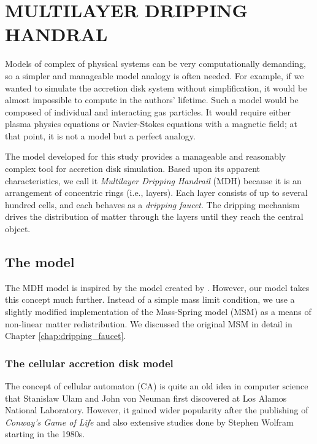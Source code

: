 \chapter{MULTILAYER DRIPPING HANDRAL}
    \label{chap:multilayer_dripping_handrail}
    \thispagestyle{empty}

    Models of complex of physical systems can be very computationally demanding, so a simpler and manageable model analogy is often needed. For example, if we wanted to simulate the accretion disk system without simplification, it would be almost impossible to compute in the authors' lifetime. Such a model would be composed of individual and interacting gas particles. It would require either plasma physics equations or Navier-Stokes equations with a magnetic field; at that point, it is not a model but a perfect analogy. 

    The model developed for this study provides a manageable and reasonably complex tool for accretion disk simulation. Based upon its apparent characteristics, we call it \emph{Multilayer Dripping Handrail} (MDH) because it is an arrangement of concentric rings (i.e., layers). Each layer consists of up to several hundred cells, and each behaves as a \emph{dripping faucet}. The dripping mechanism drives the distribution of matter through the layers until they reach the central object.

\section{The model}
    The MDH model is inspired by the model created by \citep{yonehara1997}. However, our model takes this concept much further. Instead of a simple mass limit condition, we use a slightly modified implementation of the Mass-Spring model (MSM) as a means of non-linear matter redistribution. We discussed the original MSM in detail in Chapter \ref{chap:dripping_faucet}. 

\subsection{The cellular accretion disk model}
    The concept of cellular automaton (CA) is quite an old idea in computer science that Stanislaw Ulam and John von Neuman first discovered at Los Alamos National Laboratory. However, it gained wider popularity after the publishing of \emph{Conway's Game of Life} \citep{gardner1970} and also extensive studies done by Stephen Wolfram starting in the 1980s.

